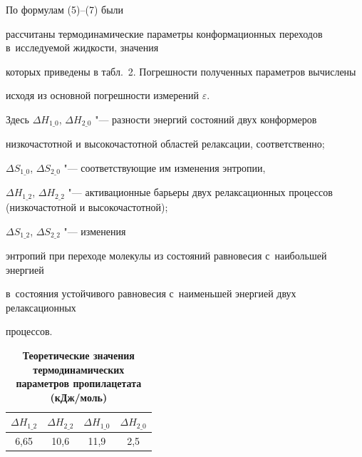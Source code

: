 По формулам (5)--(7) были

рассчитаны термодинамические параметры конформационных переходов в~исследуемой жидкости, значения 

которых приведены в табл.~2. Погрешности полученных параметров вычислены 

исходя из основной погрешности измерений $\varepsilon$.

Здесь $\Delta H_{1\_0} $, $\Delta H_{2\_0}$ "--- разности энергий состояний двух конформеров 

низкочастотной и высокочастотной  областей релаксации, соответственно;  

$\Delta S_{1\_0}$, $\Delta S_{2\_0} $ "--- соответствующие им изменения энтропии,

$\Delta H_{1\_2}$, $\Delta H_{2\_2}$ "--- активационные барьеры двух релаксационных процессов  (низкочастотной и высокочастотной); 

$\Delta S_{1\_2}$, $\Delta S_{2\_2} $ "--- изменения 

энтропий при переходе молекулы из состояний равновесия с~наибольшей энергией 

в~состояния устойчивого равновесия с~наименьшей энергией двух релаксационных 

процессов.



\begin{table}

\centering

\begin{minipage} [t]{6.3cm}

\centering

\caption{\small\bfseries Теоретические значения термодинамических параметров пропилацетата (кДж/моль)}\vspace{-3mm}

\begin{tabular}{c|c|c|c}

\hline

$\Delta H_{1\_2} $& 

$\Delta H_{2\_2} $& 

$\Delta H_{1\_0} $& 

$\Delta H_{2\_0} $\\

\hline

6,65& 

10,6& 

11,9& 

2,5 \\

\hline

\end{tabular}

\end{minipage}

\renewcommand{\bfdefault}{bx}

\vspace{5mm}

\end{table}






